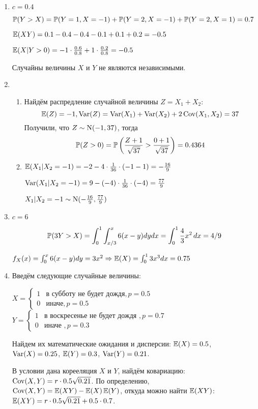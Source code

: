 \begin{enumerate}
\item $c = 0.4$

$\P(Y>X) = \P(Y=1, X=-1) + \P(Y=2, X=-1) + \P(Y=2, X=1) = 0.7$

$\E(XY) = 0.1 -0.4 - 0.4 -0.1 + 0.1 +0.2 =-0.5$

$\E(X|Y>0) = -1\cdot\frac{0.6}{0.8} + 1\cdot \frac{0.2}{0.8} = -0.5$

Случайны величины $X$ и $Y$ не являются независимыми.
\item
\begin{enumerate}
\item Найдём распредление случайной величины $Z = X_1 + X_2$:
\[
\E(Z) = -1, \Var(Z) = \Var(X_1) + \Var(X_2) + 2 \Cov(X_1, X_2) = 37
\]
Получили, что $Z \sim \cN(-1, 37)$, тогда
\[
\P(Z>0) = \P\left(\frac{Z+1}{\sqrt{37}} > \frac{0+1}{\sqrt{37}}\right) = 0.4364
\]
\item $\E(X_1 | X_2 = -1) = -2 -4 \cdot \frac{1}{36} \cdot (-1 -1) = -\frac{16}{9}$

$\Var(X_1 | X_2 = -1) = 9 - (-4) \cdot \frac{1}{36} \cdot (-4) = \frac{77}{9}$

$X_1 | X_2 = -1 \sim \cN(-\frac{16}{9}, \frac{77}{9})$
\end{enumerate}
\item $c=6$

\[
	\P(3Y>X) = \int_{0}^{1} \int_{x/3}^{x} 6(x-y) dy dx = \int_0^1 \frac{4}{3} x^2 \, dx = 4/9
\]

$f_{X} (x) = \int_{0}^{x} 6(x-y) dy = 3x^2 \Rightarrow \E(X) = \int_{0}^{1} 3x^3 dx = 0.75$
\item Введём следующие случайные величины:

$
X = \begin{cases}
1 & \text{в субботу не будет дождя}, p=0.5 \\
0 & \text{иначе}, p=0.5
\end{cases}
$
\hspace{0.5cm}
$
Y = \begin{cases}
1 & \text{в воскресенье не будет дождя }, p=0.7 \\
0 & \text{иначе }, p=0.3
\end{cases}
$

Найдем их математические ожидания и дисперсии: $\E(X)=0.5$, $\Var(X)=0.25$,
$\E(Y)=0.3$, $\Var(Y)=0.21$.

В условии дана корееляция $X$ и $Y$, найдём ковариацию: $\Cov(X, Y) =
r \cdot 0.5 \sqrt{0.21}$.
По определению, $\Cov(X, Y) = \E(XY)-\E(X)\E(Y)$, откуда можно найти $\E(XY)$:
$\E(XY) = r \cdot 0.5 \sqrt{0.21} + 0.5 \cdot 0.7$.


\end{enumerate}
